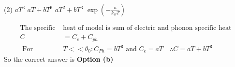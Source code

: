 \begin{enumerate}
 \begin{tasks}(2)
	\task[\textbf{a.}]$a T^{3}$
	\task[\textbf{b.}]$a T+b T^{3}$
	\task[\textbf{c.}] $a T^{2}+b T^{3}$
	\task[\textbf{d.}] $\exp \left(-\frac{a}{k_{B} T}\right)$
\end{tasks}
\begin{answer}
	\begin{align*}
	\text{The specific }&\text{heat of model is sum of electric and phonon specific heat}\\
	C&=C_{e}+C_{p h}\\
\text{	For }&T<<\theta_{0}: C_{P h}=b T^{3}\text{ and }C_{e}=a T \quad \therefore C=a T+b T^{3}
	\end{align*}
		So the correct answer is \textbf{Option (b)}
\end{answer}




\end{enumerate}